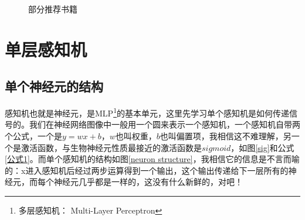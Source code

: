 \documentclass[a5paper, 11pt]{ctexbook}
\begin{document}
\begin{figure}[ht]
    \centering
    \caption{部分推荐书籍}
\end{figure}


\tableofcontents

\chapter{单层感知机} \label{单层感知机}

\section{单个神经元的结构}
感知机也就是神经元，是MLP\footnote{多层感知机： Multi-Layer Perceptron}的基本单元，这里先学习单个感知机是如何传递信号的。我们在神经网络图像中一般用一个圆来表示一个感知机，一个感知机自带两个公式，一个是$y=wx+b$，$w$也叫权重，$b$也叫偏置项，我相信这不难理解，另一个是激活函数，\label{为什么用sigmoid}与生物神经元性质最接近的激活函数是$sigmoid$，如图\ref{sig}和公式\ref{公式1}。而单个感知机的结构如图\ref{neuron structure}，我相信它的信息是不言而喻的：x进入感知机后经过两步运算得到一个输出，这个输出传递给下一层所有的神经元，而每个神经元几乎都是一样的，这没有什么新鲜的，对吧！
\end{document}
